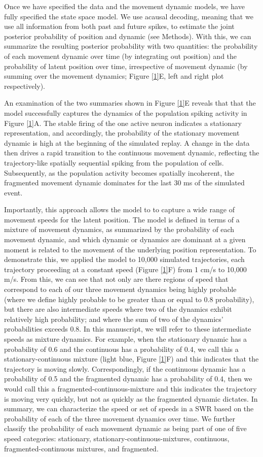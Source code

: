 \documentclass[times, twoside]{zHenriquesLab-StyleBioRxiv}
\begin{document}
Once we have specified the data and the movement dynamic models, we have fully specified the state space model. We use acausal decoding, meaning that we use all information from both past and future spikes, to estimate the joint posterior probability of position and dynamic (see Methods). With this, we can summarize the resulting posterior probability with two quantities: the probability of each movement dynamic over time (by integrating out position) and the probability of latent position over time, irrespective of movement dynamic (by summing over the movement dynamics; Figure \ref{1}E, left and right plot respectively). 

An examination of the two summaries shown in Figure \ref{1}E reveals that that the model successfully captures the dynamics of the population spiking activity in Figure \ref{1}A. The stable firing of the one active neuron indicates a stationary representation, and accordingly, the probability of the stationary movement dynamic is high at the beginning of the simulated replay. A change in the data then drives a rapid transition to the continuous movement dynamic, reflecting the trajectory-like spatially sequential spiking from the population of cells. Subsequently, as the population activity becomes spatially incoherent, the fragmented movement dynamic dominates for the last 30 ms of the simulated event.

Importantly, this approach allows the model to to capture a wide range of movement speeds for the latent position. The model is defined in terms of a mixture of movement dynamics, as summarized by the probability of each movement dynamic, and which dynamic or dynamics are dominant at a given moment is related to the movement of the underlying position representation. To demonstrate this, we applied the model to 10,000 simulated trajectories, each trajectory proceeding at a constant speed (Figure \ref{1}F) from 1 cm/s to 10,000 m/s. From this, we can see that not only are there regions of speed that correspond to each of our three movement dynamics being highly probable (where we define highly probable to be greater than or equal to 0.8 probability), but there are also intermediate speeds where two of the dynamics exhibit relatively high probability; and where the sum of two of the dynamics' probabilities exceeds 0.8. In this manuscript, we will refer to these intermediate speeds as mixture dynamics. For example, when the stationary dynamic has a probability of 0.6 and the continuous has a probability of 0.4, we call this a stationary-continuous mixture (light blue, Figure \ref{1}F) and this indicates that the trajectory is moving slowly. Correspondingly, if the continuous dynamic has a probability of 0.5 and the fragmented dynamic has a probability of 0.4, then we would call this a fragmented-continuous-mixture and this indicates the trajectory is moving very quickly, but not as quickly as the fragmented dynamic dictates. In summary, we can characterize the speed or set of speeds in a SWR based on the probability of each of the three movement dynamics over time. We further classify the probability of each movement dynamic as being part of one of five speed categories: stationary, stationary-continuous-mixtures, continuous, fragmented-continuous mixtures, and fragmented.
\end{document}
